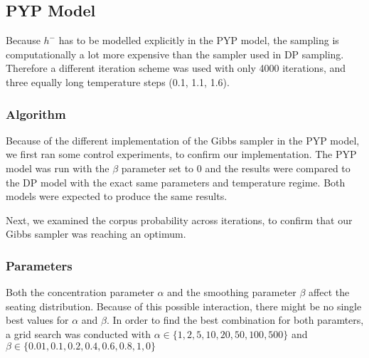 \subsection{PYP Model}

Because $h^{-}$ has to be modelled explicitly in the PYP model, the sampling is computationally a lot more expensive than the sampler used in DP sampling. Therefore a different iteration scheme was used with only 4000 iterations, and three equally long temperature steps (0.1, 1.1, 1.6).

\subsubsection{Algorithm}
Because of the different implementation of the Gibbs sampler in the PYP model, we first ran some control experiments, to confirm our implementation.
The PYP model was run with the $\beta$ parameter set to 0 and the results were compared to the DP model with the exact same parameters and temperature regime. Both models were expected to produce the same results.

Next, we examined the corpus probability across iterations, to confirm that our Gibbs sampler was reaching an optimum.

\subsubsection{Parameters}
Both the concentration parameter $\alpha$ and the smoothing parameter $\beta$ affect the seating distribution. Because of this possible interaction, there might be no single best values for $\alpha$ and $\beta$. In order to find the best combination for both paramters, a grid search was conducted with $\alpha \in \{1, 2, 5, 10, 20, 50, 100, 500 \}$ and $\beta \in \{ 0.01, 0.1, 0.2, 0.4,0.6, 0.8, 1, 0 \}$
